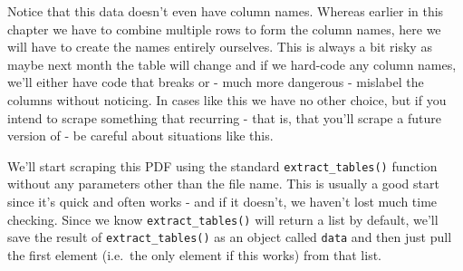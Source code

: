 \documentclass[
  12pt,
]{book}
\begin{document}
Notice that this data doesn't even have column names. Whereas earlier in this chapter we have to combine multiple rows to form the column names, here we will have to create the names entirely ourselves. This is always a bit risky as maybe next month the table will change and if we hard-code any column names, we'll either have code that breaks or - much more dangerous - mislabel the columns without noticing. In cases like this we have no other choice, but if you intend to scrape something that recurring - that is, that you'll scrape a future version of - be careful about situations like this.

We'll start scraping this PDF using the standard \texttt{extract\_tables()} function without any parameters other than the file name. This is usually a good start since it's quick and often works - and if it doesn't, we haven't lost much time checking. Since we know \texttt{extract\_tables()} will return a list by default, we'll save the result of \texttt{extract\_tables()} as an object called \texttt{data} and then just pull the first element (i.e.~the only element if this works) from that list.
\end{document}
